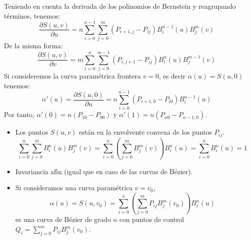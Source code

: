 \documentclass[ebook,oneside]{memoir}
\begin{document}
Teniendo en cuenta la derivada de los polinomios de Bernstein y reagrupando t\'{e}rminos, tenemos:
$$\frac{\partial S(u,v)}{\partial u}=n\sum_{i=0}^{n-1} \sum_{j=0}^m (P_{i+1,j}-P_{ij}) B_i^{n-1}(u) B_j^m(v)$$
De la misma forma:
$$\frac{\partial S(u,v)}{\partial v}=m\sum_{i=0}^{n} \sum_{j=0}^{m-1} (P_{i,j+1}-P_{ij}) B_i^{n}(u) B_j^{m-1}(v)$$
Si consideremos la curva param\'{e}trica frontera $v=0$, es decir $\alpha(u)=S(u,0)$ tenemos:
$$\alpha'(u)=\frac{\partial S(u,0)}{\partial u}=n\sum_{i=0}^{n-1} (P_{i+1,0}-P_{i0}) B_i^{n-1}(u)$$
Por tanto, $\alpha'(0)=n(P_{10}-P_{00})$ y $\alpha'(1)=n(P_{n0}-P_{n-1,0}).$

\begin{itemize}
\item Los puntos $S(u,v)$ est\'{a}n en la envolvente convexa de los puntos $P_{ij}$.
$$\sum_{i=0}^{n} \sum_{j=0}^m B_i^{n}(u) B_j^m(v)= \sum_{i=0}^{n}\left( \sum_{j=0}^m B_j^m(v) \right) B_i^{n}(u)=\sum_{i=0}^{n} B_i^{n}(u)=1$$
\item Invariancia af\'{\i}n (igual que en caso de las curvas de B\'{e}zier).
\item Si consideramos una curva param\'{e}trica $v=v_0$,
$$\alpha(u)=S(u,v_0)=\sum_{i=0}^n \left( \sum_{j=0}^m P_{ij} B_j^m(v_0) \right) B_i^n(u)$$
es una curva de B\'{e}zier de grado $n$ con puntos de control $Q_i=\sum_{j=0}^m P_{ij} B_j^m(v_0).$
\end{itemize}
\end{document}
